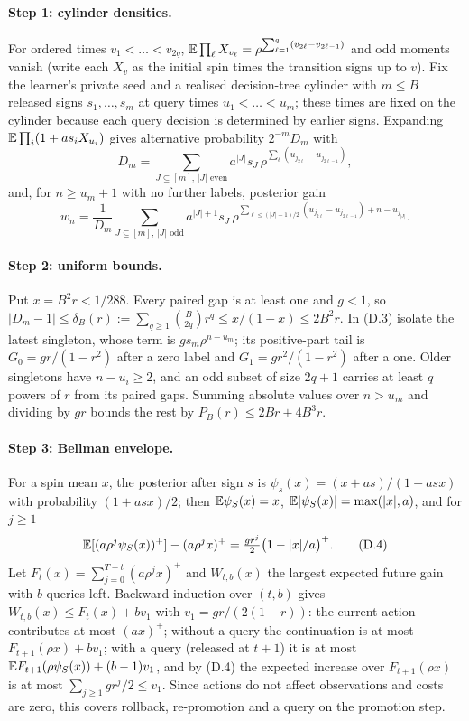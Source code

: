 \paragraph{Step 1: cylinder densities.} For ordered times $v_1<\dots<v_{2q}$, $\mathbb{E}\prod_\ell X_{v_\ell}=\rho^{\sum_{\ell=1}^q(v_{2\ell}-v_{2\ell-1})}$ and odd moments vanish (write each $X_v$ as the initial spin times the transition signs up to $v$). Fix the learner's private seed and a realised decision-tree cylinder with $m\le B$ released signs $s_1,\dots,s_m$ at query times $u_1<\dots<u_m$; these times are fixed on the cylinder because each query decision is determined by earlier signs. Expanding $\mathbb{E}\prod_i(1+as_iX_{u_i})$ gives alternative probability $2^{-m}D_m$ with
\[
D_m=\sum_{J\subseteq[m],\,|J|\text{ even}}a^{|J|}s_J\,\rho^{\sum_\ell(u_{j_{2\ell}}-u_{j_{2\ell-1}})},
\tag{D.2}
\]
and, for $n\ge u_m+1$ with no further labels, posterior gain
\[
w_n=\frac1{D_m}\sum_{J\subseteq[m],\,|J|\text{ odd}}a^{|J|+1}s_J\,\rho^{\sum_{\ell\le(|J|-1)/2}(u_{j_{2\ell}}-u_{j_{2\ell-1}})+n-u_{j_{|J|}}}.
\tag{D.3}
\]

\paragraph{Step 2: uniform bounds.} Put $x=B^2r<1/288$. Every paired gap is at least one and $g<1$, so $|D_m-1|\le\delta_B(r):=\sum_{q\ge1}\binom{B}{2q}r^q\le x/(1-x)\le2B^2r$. In (D.3) isolate the latest singleton, whose term is $gs_m\rho^{n-u_m}$; its positive-part tail is $G_0=gr/(1-r^2)$ after a zero label and $G_1=gr^2/(1-r^2)$ after a one. Older singletons have $n-u_i\ge2$, and an odd subset of size $2q+1$ carries at least $q$ powers of $r$ from its paired gaps. Summing absolute values over $n>u_m$ and dividing by $gr$ bounds the rest by $P_B(r)\le2Br+4B^3r$.

\paragraph{Step 3: Bellman envelope.} For a spin mean $x$, the posterior after sign $s$ is $\psi_s(x)=(x+as)/(1+asx)$ with probability $(1+asx)/2$; then $\mathbb{E}\psi_S(x)=x$, $\mathbb{E}|\psi_S(x)|=\max(|x|,a)$, and for $j\ge1$
\[
\mathbb{E}[(a\rho^j\psi_S(x))^+]-(a\rho^jx)^+=\tfrac{gr^j}{2}\big(1-|x|/a\big)^+.
\tag{D.4}
\]
Let $F_t(x)=\sum_{j=0}^{T-t}(a\rho^jx)^+$ and $W_{t,b}(x)$ the largest expected future gain with $b$ queries left. Backward induction over $(t,b)$ gives $W_{t,b}(x)\le F_t(x)+bv_1$ with $v_1=gr/(2(1-r))$: the current action contributes at most $(ax)^+$; without a query the continuation is at most $F_{t+1}(\rho x)+bv_1$; with a query (released at $t+1$) it is at most $\mathbb{E} F_{t+1}(\rho\psi_S(x))+(b-1)v_1$, and by (D.4) the expected increase over $F_{t+1}(\rho x)$ is at most $\sum_{j\ge1}gr^j/2\le v_1$. Since actions do not affect observations and costs are zero, this covers rollback, re-promotion and a query on the promotion step.

